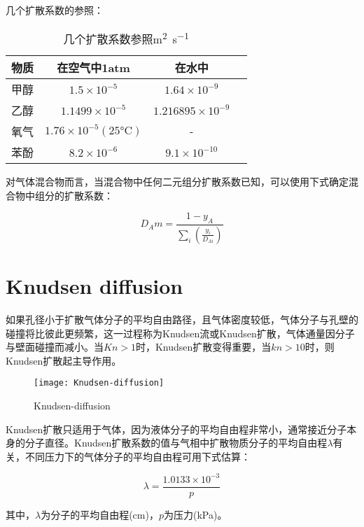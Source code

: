 几个扩散系数的参照：

\begin{table}[!htb]
    \centering
    \caption{几个扩散系数参照\si{\square\meter\per\second}}
    \begin{tabular}{cccc}
        \toprule
        物质 & 在空气中1atm & 在水中 \\
        \midrule
        甲醇 & $ 1.5\times10^{-5} $ & $ 1.64\times10^{-9} $ \\
        乙醇 & $ 1.1499\times10^{-5} $ & $ 1.216895\times10^{-9} $ \\
        氧气 & $ 1.76\times10^{-5}(25\si{\degreeCelsius}) $ & - \\
        苯酚 & $ 8.2\times10^{-6} $ & $ 9.1\times10^{-10} $ \\
        \bottomrule
    \end{tabular}
\end{table}

对气体混合物而言，当混合物中任何二元组分扩散系数已知，可以使用下式确定混合物中组分的扩散系数：

\begin{equation}
D_Am = \frac{1-y_A}{\sum_i\left( \frac{y_i}{D_{Ai}} \right)}
\end{equation}

\section{Knudsen diffusion}

如果孔径小于扩散气体分子的平均自由路径，且气体密度较低，气体分子与孔壁的碰撞将比彼此更频繁，这一过程称为Knudsen流或Knudsen扩散，气体通量因分子与壁面碰撞而减小。当$ Kn>1 $时，Knudsen扩散变得重要，当$ kn>10 $时，则Knudsen扩散起主导作用。

\begin{figure}[h]
    \centering
    \texttt{[image: Knudsen-diffusion]}
    \caption{Knudsen-diffusion}
\end{figure}

Knudsen扩散只适用于气体，因为液体分子的平均自由程非常小，通常接近分子本身的分子直径。Knudsen扩散系数的值与气相中扩散物质分子的平均自由程$ \lambda $有关，不同压力下的气体分子的平均自由程可用下式估算：

\begin{equation}
\lambda = \frac{1.0133\times10^{-3}}{p}
\end{equation}

其中，$ \lambda $为分子的平均自由程(\si{cm})，$ p $为压力(\si{\kPa})。

